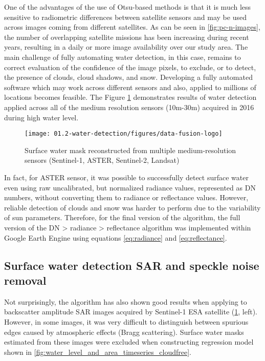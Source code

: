 One of the advantages of the use of Otsu-based methods is that it is much less sensitive to radiometric differences between satellite sensors and may be used across images coming from different satellites. As can be seen in \ref{fig:pc-n-images}, the number of overlapping satellite missions has been increasing during recent years, resulting in a daily or more image availability over our study area. The main challenge of fully automating water detection, in this case, remains to correct evaluation of the confidence of the image pixels, to exclude, or to detect, the presence of clouds, cloud shadows, and snow. Developing a fully automated software which may work across different sensors and also, applied to millions of locations becomes feasible. The Figure \ref{fig:multiple-sensors} demonstrates results of water detection applied across all of the medium resolution sensors (10m-30m) acquired in 2016 during high water level.

\begin{figure}[H]
	\texttt{[image: 01.2-water-detection/figures/data-fusion-logo]}
	\caption{Surface water mask reconstructed from multiple medium-resolution sensors (Sentinel-1, ASTER, Sentinel-2, Landsat)}
	\label{fig:multiple-sensors}
\end{figure}

In fact, for ASTER sensor, it was possible to successfully detect surface water even using raw uncalibrated, but normalized radiance values, represented as DN numbers, without converting them to radiance or reflectance values. However, reliable detection of clouds and snow was harder to perform due to the variability of sun parameters. Therefore, for the final version of the algorithm, the full version of the DN > radiance > reflectance algorithm was implemented within Google Earth Engine using equations \ref{eq:radiance} and \ref{eq:reflectance}.

\subsection{Surface water detection SAR and speckle noise removal}

Not surprisingly, the algorithm has also shown good results when applying to backscatter amplitude SAR images acquired by Sentinel-1 ESA satellite (\ref{fig:multiple-sensors}, left). However, in some images, it was very difficult to distinguish between spurious edges caused by atmospheric effects (Bragg scattering). Surface water masks estimated from these images were excluded when constructing regression model shown in \ref{fig:water_level_and_area_timeseries_cloudfree}.

